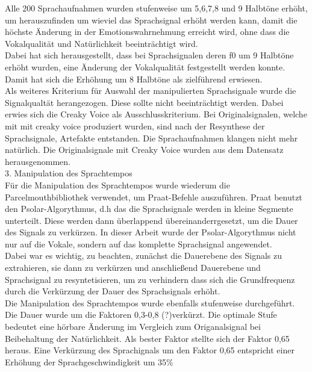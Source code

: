 \documentclass[11pt,a4paper,headsepline,twoside,toc=bibliography]{scrreprt}
\begin{document}
Alle 200 Sprachaufnahmen wurden stufenweise um 5,6,7,8 und 9 Halbtöne erhöht, um herauszufinden um wieviel das Sprachsignal erhöht werden kann, damit die höchste Änderung in der Emotionswahrnehmung erreicht wird, ohne dass die Vokalqualität und Natürlichkeit beeinträchtigt wird.\\

Dabei hat sich herausgestellt, dass bei Sprachsignalen deren f0 um 9 Halbtöne erhöht wurden, eine Änderung der Vokalqualität festgestellt werden konnte.
Damit hat sich die Erhöhung um 8 Halbtöne als zielführend erwiesen.\\

Als weiteres Kriterium für Auswahl der manipulierten Sprachsignale wurde die Signalqualtät herangezogen. Diese sollte nicht beeinträchtigt werden.
Dabei erwies sich die Creaky Voice als Ausschlusskriterium.
Bei Originalsignalen, welche mit  mit creaky voice produziert wurden, sind nach der Resynthese der Sprachsignale, Artefakte entstanden. Die Sprachaufnahmen klangen nicht mehr natürlich.
Die Originalsignale mit Creaky Voice wurden aus dem Datensatz herausgenommen.\\

3. Manipulation des Sprachtempos\\

Für die Manipulation des Sprachtempos wurde wiederum die Parcelmouthbibliothek verwendet, um Praat-Befehle auszuführen.
Praat benutzt den Psolar-Algorythmus, d.h das die Sprachsignale werden in kleine Segmente unterteilt. Diese werden dann überlappend übereinanderrgesetzt, um die Dauer des Signals zu verkürzen.
In dieser Arbeit wurde der Psolar-Algorythmus nicht nur auf die Vokale, sondern auf das komplette Sprachsignal angewendet.\\

Dabei war es wichtig, zu beachten, zunächst die Dauerebene des Signals zu extrahieren, sie dann zu verkürzen und anschließend Dauerebene und Sprachsignal zu resyntetisieren, um zu verhindern dass sich die Grundfrequenz durch die Verkürzung der Dauer des Sprachsignals erhöht.\\

Die Manipulation des Sprachtempos wurde ebenfalls stufenweise durchgeführt. Die Dauer wurde um die Faktoren 0,3-0,8 (?)verkürzt.
Die optimale Stufe bedeutet eine hörbare Änderung im Vergleich zum Origanalsignal bei Beibehaltung der Natürlichkeit.
Als bester Faktor stellte sich der Faktor 0,65 heraus.
Eine Verkürzung des Sprachignals um den Faktor 0,65 entspricht einer Erhöhung der Sprachgeschwindigkeit um 35\%
\end{document}
